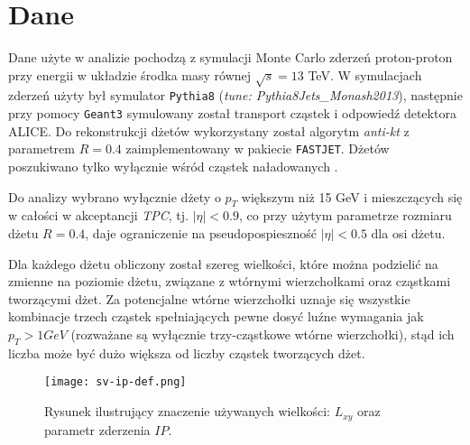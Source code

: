 \section{Dane}
\label{sec:dane}


Dane użyte w analizie pochodzą z symulacji Monte Carlo zderzeń proton-proton przy energii w układzie środka masy równej $\sqrt{s} = 13$ TeV. 
W symulacjach zderzeń użyty był symulator \texttt{Pythia8} (\textit{tune: Pythia8Jets\_Monash2013}), następnie przy pomocy \texttt{Geant3} symulowany został transport cząstek i odpowiedź detektora ALICE. 
Do rekonstrukcji dżetów wykorzystany został algorytm \textit{anti-kt} z parametrem $R = 0.4$ zaimplementowany w pakiecie \texttt{FASTJET}. Dżetów poszukiwano tylko wyłącznie wśród cząstek naładowanych .

Do analizy wybrano wyłącznie dżety o $p_T$ większym niż 15 GeV i mieszczących się w całości w akceptancji \textit{TPC}, tj. $|\eta| < 0.9$, co przy użytym parametrze rozmiaru dżetu $R = 0.4$, daje ograniczenie na pseudopospieszność $|\eta| < 0.5$ dla osi dżetu.

Dla każdego dżetu obliczony został szereg wielkości, które można podzielić na zmienne na poziomie dżetu, związane z wtórnymi wierzchołkami oraz cząstkami tworzącymi dżet. 
Za potencjalne wtórne wierzchołki uznaje się wszystkie kombinacje trzech cząstek spełniających pewne dosyć luźne wymagania jak $p_T > 1 GeV$ (rozważane są wyłącznie trzy-cząstkowe wtórne wierzchołki), stąd ich liczba może być dużo większa od liczby cząstek tworzących dżet.


\begin{figure}
	\centering
	\texttt{[image: sv-ip-def.png]}
	\caption{Rysunek ilustrujący znaczenie używanych wielkości: $L_{xy}$ oraz parametr zderzenia $IP$.}
	\label{fig:sv-ip-def}
\end{figure}

